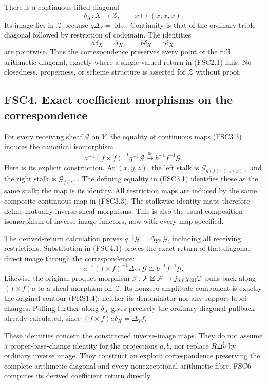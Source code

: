 There is a continuous lifted diagonal \[
\delta_X:X\to\mathcal Z,\qquad x\mapsto(x,x,x).
\tag{FSC3.5}
\] Its image lies in \(\mathcal Z\) because
\(q\Delta_Y=\operatorname{id}_Y\). Continuity is that of the ordinary
triple diagonal followed by restriction of codomain. The identities \[
a\delta_X=\Delta_X,\qquad b\delta_X=\operatorname{id}_X
\tag{FSC3.6}
\] are pointwise. Thus the correspondence preserves every point of the
full arithmetic diagonal, exactly where a single-valued return in
(FSC2.1) fails. No closedness, properness, or scheme structure is
asserted for \(\mathcal Z\) without proof.

\subsection{FSC4. Exact coefficient morphisms on the
correspondence}\label{fsc4.-exact-coefficient-morphisms-on-the-correspondence}

For every receiving sheaf \(\mathcal G\) on \(Y\), the equality of
continuous maps (FSC3.3) induces the canonical isomorphism \[
a^{-1}(f\times f)^{-1}q^{-1}\mathcal G
\xrightarrow{\ \cong\ }b^{-1}f^{-1}\mathcal G.
\tag{FSC4.1}
\] Here is its explicit construction. At \((x,y,z)\), the left stalk is
\(\mathcal G_{q(f(x),f(y))}\) and the right stalk is
\(\mathcal G_{f(z)}\). The defining equality in (FSC3.1) identifies
these as the same stalk; the map is its identity. All restriction maps
are induced by the same composite continuous map in (FSC3.3). The
stalkwise identity maps therefore define mutually inverse sheaf
morphisms. This is also the usual composition isomorphism of
inverse-image functors, now with every map specified.

The derived-return calculation proves
\(q^{-1}\mathcal G=\Delta_{Y*}\mathcal G\), including all receiving
restrictions. Substitution in (FSC4.1) proves the exact return of that
diagonal direct image through the correspondence: \[
a^{-1}(f\times f)^{-1}\Delta_{Y*}\mathcal G
\cong b^{-1}f^{-1}\mathcal G.
\tag{FSC4.2}
\] Likewise the original product morphism
\(\beta:\mathcal F\boxtimes\mathcal F\to j_{\eta\eta!}\chi_{\rm dil}\mathbb C\)
pulls back along \((f\times f)a\) to a sheaf morphism on \(\mathcal Z\).
Its nonzero-amplitude component is exactly the original contour
(PRS1.4); neither its denominator nor any support label changes. Pulling
further along \(\delta_X\) gives precisely the ordinary diagonal
pullback already calculated, since \((f\times f)a\delta_X=\Delta_Yf\).

These identities concern the constructed inverse-image maps. They do not
assume a proper-base-change identity for the projections \(a,b\), nor
replace \(R\Delta_Y^!\) by ordinary inverse image. They construct an
explicit correspondence preserving the complete arithmetic diagonal and
every nonexceptional arithmetic fibre. FSC6 computes its derived
coefficient return directly.

